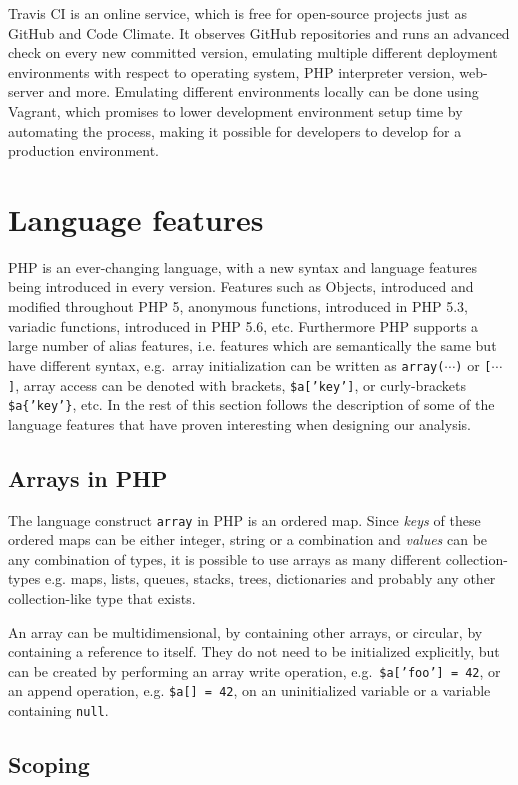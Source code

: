 Travis CI is an online service, which is free for open-source projects just as GitHub and Code Climate. It observes GitHub repositories and runs an advanced check on every new committed version, emulating multiple different deployment environments with respect to operating system, PHP interpreter version, web-server and more. Emulating different environments locally can be done using Vagrant, which promises to lower development environment setup time by automating the process, making it possible for developers to develop for a production environment.


\section{Language features}
PHP is an ever-changing language, with a new syntax and language features being introduced in every version. Features such as Objects, introduced and modified throughout PHP 5, anonymous functions, introduced in PHP 5.3, variadic functions, introduced in PHP 5.6, etc. Furthermore PHP supports a large number of alias features, i.e. features which are semantically the same but have different syntax, e.g.\ array initialization can be written as \texttt{array($\cdots$)} or \texttt{[$\cdots$]}, array access can be denoted with brackets, \texttt{\$a['key']}, or curly-brackets \texttt{\$a\{'key'\}}, etc. In the rest of this section follows the description of some of the language features that have proven interesting when designing our analysis.

\subsection{Arrays in PHP}
The language construct \texttt{array} in PHP is an ordered map. Since \emph{keys} of these ordered maps can be either integer, string or a combination and \emph{values} can be any combination of types, it is possible to use arrays as many different collection-types e.g. maps, lists, queues, stacks, trees, dictionaries and probably any other collection-like type that exists. 

An array can be multidimensional, by containing other arrays, or circular, by containing a reference to itself. They do not need to be initialized explicitly, but can be created by performing an array write operation, e.g.\ \texttt{\$a['foo'] = 42}, or an append operation, e.g. \texttt{\$a[] = 42}, on an uninitialized variable or a variable containing \texttt{null}.

\subsection{Scoping}
\label{sec:backg_scoping}

